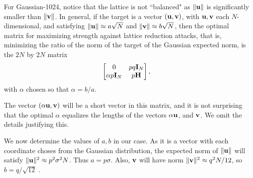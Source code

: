 \documentclass{llncs}
\newcommand{\bfu}{{\bf u}}
\newcommand{\bfv}{{\bf v}}
\newcommand{\bfH}{{\bf H}}
\newcommand{\bfI}{{\bf I}}
\newcommand{\<}{\langle}
\renewcommand{\>}{\rangle}
\begin{document}
For {\sf Gaussian-1024},
notice that the lattice is not ``balanced" as $\|\bfu\|$ is significantly smaller than $\|\bfv\|$.
In general, if the target is a vector $(\bfu,\bfv)$, with $\bfu,\bfv$ each $N$-dimensional, and satisfying $\|\bfu\| \approx a\sqrt{N}$ and $\|\bfv\| \approx b\sqrt{N}$, then the optimal matrix for maximizing strength against lattice reduction attacks, that is, minimizing the ratio of the norm of the target of the Gaussian expected norm, is the $2N$ by $2N$ matrix
$$
 \begin{bmatrix}
0&  p q\bfI_N\\
\alpha p\bfI_N& p\bfH \\
\end{bmatrix},
$$
with $\alpha$ chosen so that $\alpha = b/a$.   %

The vector $(\alpha \bfu,\bfv)$ will be a short vector in this matrix, and it is not surprising that the optimal $\alpha$ equalizes  the lengths of the vectors $\alpha \bfu$, and $\bfv$.  We omit the details justifying this.

We now determine the values of $a,b$ in our case.
 As it is a  vector with each coordinate choses from the Gaussian distribution, the expected norm of $\|\bfu\|$ will satisfy 
$\|\bfu\|^2 \approx p^2 \sigma^2 N$.   
Thus $a = p \sigma$.
Also, 
$\bfv$ will have norm $\|\bfv\|^2 \approx q^2N/12$, so $b = q/\sqrt{12}$ .    
\end{document}
